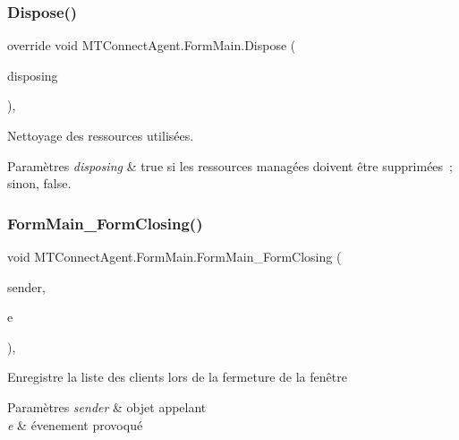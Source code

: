 \subsubsection{\texorpdfstring{Dispose()}{Dispose()}}
{\footnotesize\ttfamily override void M\+T\+Connect\+Agent.\+Form\+Main.\+Dispose (\begin{DoxyParamCaption}\item[{bool}]{disposing }\end{DoxyParamCaption})\hspace{0.3cm}{\ttfamily [inline]}, {\ttfamily [protected]}}



Nettoyage des ressources utilisées. 


\begin{DoxyParams}{Paramètres}
{\em disposing} & true si les ressources managées doivent être supprimées ; sinon, false.\\
\hline
\end{DoxyParams}
\mbox{\label{class_m_t_connect_agent_1_1_form_main_a7bf61fab117d7928a7f0cc0eca0d2189}} 
\subsubsection{\texorpdfstring{Form\+Main\+\_\+\+Form\+Closing()}{FormMain\_FormClosing()}}
{\footnotesize\ttfamily void M\+T\+Connect\+Agent.\+Form\+Main.\+Form\+Main\+\_\+\+Form\+Closing (\begin{DoxyParamCaption}\item[{object}]{sender,  }\item[{Form\+Closing\+Event\+Args}]{e }\end{DoxyParamCaption})\hspace{0.3cm}{\ttfamily [inline]}, {\ttfamily [private]}}



Enregistre la liste des clients lors de la fermeture de la fenêtre 


\begin{DoxyParams}{Paramètres}
{\em sender} & objet appelant\\
\hline
{\em e} & évenement provoqué\\
\hline
\end{DoxyParams}
\mbox{\label{class_m_t_connect_agent_1_1_form_main_a6135a4be969947c0c26db758ba0acaed}} 
